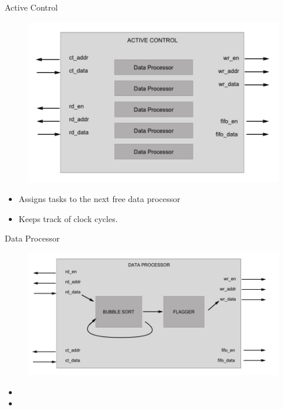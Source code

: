 \documentclass{beamer}
\begin{document}
\begin{frame}{Active Control}
  \begin{figure}
    \includegraphics[scale=0.3]{ActiveControl}
  \end{figure}
  \begin{itemize}
    \item
      Assigns tasks to the next free data processor
    \item
      Keeps track of clock cycles.
  \end{itemize}
\end{frame}

\begin{frame}{Data Processor}
  \begin{figure}
    \includegraphics[scale=0.3]{DataProcessor}
  \end{figure}
  \begin{itemize}
    \item

    \item

  \end{itemize}
\end{frame}
\end{document}
